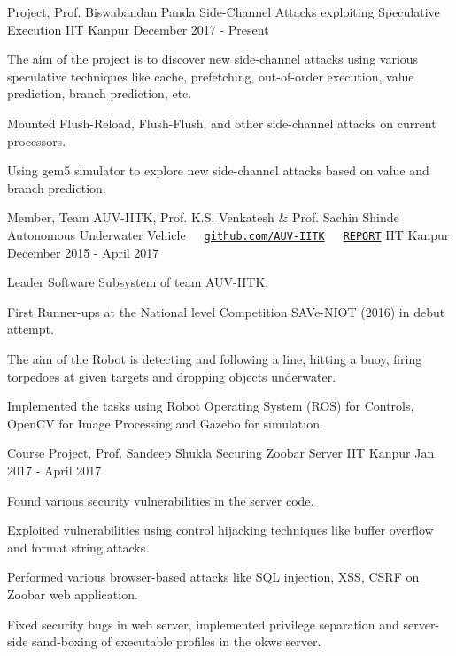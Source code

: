 \documentclass[12pt, a4paper]{awesome-cv}
\begin{document}

\begin{cventries}
  \cventry
    {Project, Prof. Biswabandan Panda}
    {Side-Channel Attacks exploiting Speculative Execution}
    {IIT Kanpur}
    {December 2017 - Present}
    {
      \begin{cvitems}
      \item The aim of the project is to discover new side-channel attacks using various speculative techniques like cache, prefetching, out-of-order execution, value prediction, branch prediction, etc.
      \item Mounted Flush-Reload, Flush-Flush, and other  side-channel attacks on current processors.
      \item Using gem5 simulator to explore new side-channel attacks based on value and branch prediction.
      \end{cvitems}
    }
    \vspace{0.2cm}

  \cventry
    {Member, Team AUV-IITK, Prof. K.S. Venkatesh \& Prof. Sachin Shinde}
    {Autonomous Underwater Vehicle\ \ \ \texttt{\href{https://github.com/AUV-IITK}{github.com/AUV-IITK}}\ \ \ \texttt{\href{https://drive.google.com/file/d/0B8_5kUnCr-WzbnRGV01lcEVTWDA/view?usp=sharing}{REPORT}} }
    {IIT Kanpur}
    {December 2015 - April 2017}
    {
      \begin{cvitems}
        \item {Leader Software Subsystem of team AUV-IITK.}
        \item {First Runner-ups at the National level Competition SAVe-NIOT (2016) in debut attempt.}
        \item {The aim of the Robot is detecting and following a line, hitting a buoy, firing torpedoes at given targets and dropping objects underwater.}
        \item {Implemented the tasks using Robot Operating System (ROS) for Controls, OpenCV for Image Processing and Gazebo for simulation.}        
      \end{cvitems}
    }

  \cventry
    {Course Project, Prof. Sandeep Shukla}
    {Securing Zoobar Server}
    {IIT Kanpur}
    {Jan 2017 - April 2017}
    {
      \begin{cvitems}
      \item Found various security vulnerabilities in the server code.
      \item Exploited vulnerabilities using control hijacking techniques like buffer overflow and format string attacks.
      \item Performed various browser-based attacks like SQL injection, XSS, CSRF on Zoobar web application.
      \item Fixed security bugs in web server, implemented privilege separation and server-side sand-boxing of executable profiles in the okws server.
      \end{cvitems}
    }


\end{cventries}
\end{document}
